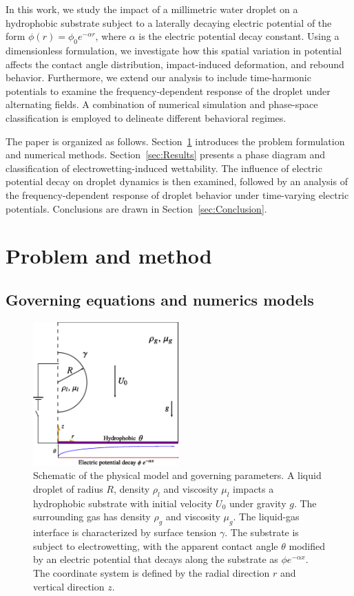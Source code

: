\documentclass[lineno]{cls/jfm}
\begin{document}
In this work, we study the impact of a millimetric water droplet on a hydrophobic substrate subject to a laterally decaying electric potential of the form $\phi(r) = \phi_0 e^{-\alpha r}$, where $\alpha$ is the electric potential decay constant. Using a dimensionless formulation, we investigate how this spatial variation in potential affects the contact angle distribution, impact-induced deformation, and rebound behavior. Furthermore, we extend our analysis to include time-harmonic potentials to examine the frequency-dependent response of the droplet under alternating fields. A combination of numerical simulation and phase-space classification is employed to delineate different behavioral regimes.

The paper is organized as follows. Section~\ref{sec:Problem and method} introduces the problem formulation and numerical methods. Section~\ref{sec:Results} presents a phase diagram and classification of electrowetting-induced wettability. The influence of electric potential decay on droplet dynamics is then examined, followed by an analysis of the frequency-dependent response of droplet behavior under time-varying electric potentials. Conclusions are drawn in Section~\ref{sec:Conclusion}.

\section{Problem and method}\label{sec:Problem and method}

\subsection{Governing equations and numerics models}

 \begin{figure}
  \centerline{\includegraphics[width=0.5\textwidth]{fig/model.eps}}
  \caption{Schematic of the physical model and governing parameters. A liquid droplet of radius $R$, density $\rho_{l}$ and viscosity $\mu_{l}$ impacts a hydrophobic substrate with initial velocity $U_{0}$ under gravity $g$. The surrounding gas has density $\rho_{g}$ and viscosity $\mu_{g}$. The liquid-gas interface is characterized by surface tension $\gamma$. The substrate is subject to electrowetting, with the apparent contact angle $\theta$ modified by an electric potential that decays along the substrate as $\phi e^{-\alpha x}$. The coordinate system is defined by the radial direction $r$ and vertical direction $z$.}
 \label{fig:domain}
 \end{figure}
\end{document}
